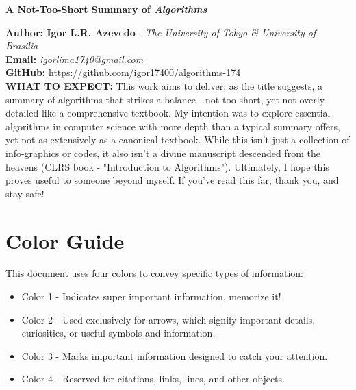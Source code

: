 \documentclass[a4paper,10pt]{article}
\begin{document}
\noindent 
\begin{center}
\textbf{{\LARGE A Not-Too-Short Summary of \textit{Algorithms}}} 
\end{center}
\vspace{1cm}

\noindent 
\textbf{Author: Igor L.R. Azevedo} - \textit{The University of Tokyo \& University of Brasilia}
\\
\textbf{Email:} \textit{igorlima1740@gmail.com}
\\
\textbf{GitHub:} \url{https://github.com/igor17400/algorithms-174}
\\


\noindent 
\textbf{WHAT TO EXPECT: } This work aims to deliver, as the title suggests, a summary of algorithms that strikes a balance—not too short, yet not overly detailed like a comprehensive textbook. My intention was to explore essential algorithms in computer science with more depth than a typical summary offers, yet not as extensively as a canonical textbook. While this isn't just a collection of info-graphics or codes, it also isn't a divine manuscript descended from the heavens (CLRS book - "Introduction to Algorithms"). Ultimately, I hope this proves useful to someone beyond myself. If you've read this far, thank you, and stay safe!
\\

\newpage

\tableofcontents

\newpage

\section{Color Guide}

This document uses four colors to convey specific types of information:
\begin{itemize}
    \item \colorbox{color1}{Color 1} - Indicates super important information, memorize it!
    \item \colorbox{color2}{Color 2} - Used exclusively for arrows, which signify important details, curiosities, or useful symbols and information.
    \item \colorbox{color3}{Color 3} - Marks important information designed to catch your attention.
    \item \colorbox{color4}{Color 4} - Reserved for citations, links, lines, and other objects.
\end{itemize}
\end{document}
